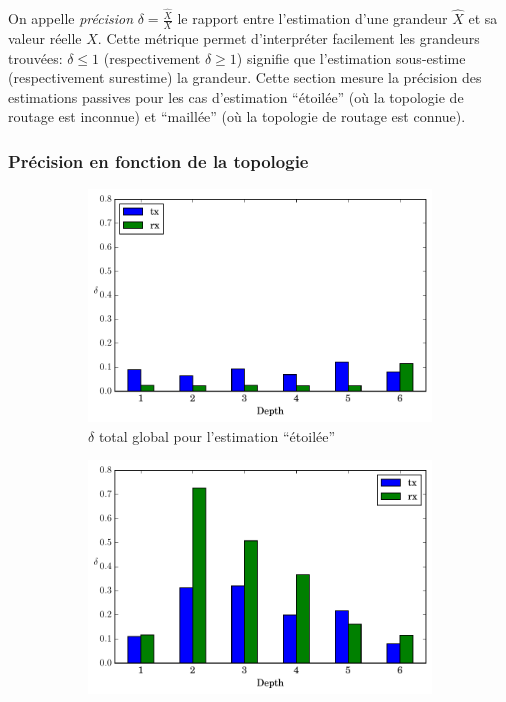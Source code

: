 On appelle \emph{précision} $\delta = \frac{\widehat{X}}{X}$ le rapport entre l'estimation d'une grandeur $\widehat{X}$ et sa valeur réelle $X$.
Cette métrique permet d'interpréter facilement les grandeurs trouvées: $\delta \leq 1$ (respectivement $\delta \geq 1$) signifie que l'estimation sous-estime (respectivement surestime) la grandeur.
Cette section mesure la précision des estimations passives pour les cas d'estimation ``étoilée'' (où la topologie de routage est inconnue) et ``maillée'' (où la topologie de routage est connue).

\subsubsection{Précision en fonction de la topologie}

\begin{figure}[ht]
  \begin{subfigure}{0.5\textwidth}
    \centering
    \includegraphics[width=\textwidth]{img/global_noinfo.pdf}
    \caption{$\delta$ total global pour l'estimation ``étoilée''}
    \label{supervision:fig:global_noinfo}
  \end{subfigure}
  \begin{subfigure}{0.5\textwidth}
    \centering
    \includegraphics[width=\textwidth]{img/global_route.pdf}

\end{subfigure}
\end{figure}
